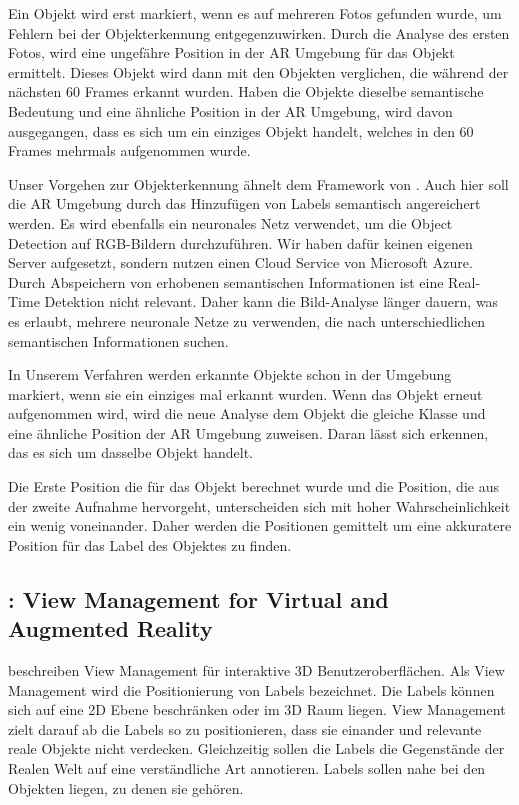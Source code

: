 Ein Objekt wird erst markiert, wenn es auf mehreren Fotos gefunden wurde, um Fehlern bei der Objekterkennung entgegenzuwirken. Durch die Analyse des ersten Fotos, wird eine ungefähre Position in der AR Umgebung für das Objekt ermittelt. Dieses Objekt wird dann mit den Objekten verglichen, die während der nächsten 60 Frames erkannt wurden. Haben die Objekte dieselbe semantische Bedeutung und eine ähnliche Position in der AR Umgebung, wird davon ausgegangen, dass es sich um ein einziges Objekt handelt, welches in den 60 Frames mehrmals aufgenommen wurde. 

Unser Vorgehen zur Objekterkennung ähnelt dem Framework von \cite{LabelingLanguageLearning}. Auch hier soll die AR Umgebung durch das Hinzufügen von Labels semantisch angereichert werden. Es wird ebenfalls ein neuronales Netz verwendet, um die Object Detection auf RGB-Bildern durchzuführen. Wir haben dafür keinen eigenen Server aufgesetzt, sondern nutzen einen Cloud Service von Microsoft Azure. Durch Abspeichern von erhobenen semantischen Informationen ist eine Real-Time Detektion nicht relevant. Daher kann die Bild-Analyse länger dauern, was es erlaubt, mehrere neuronale Netze zu verwenden, die nach unterschiedlichen semantischen Informationen suchen.

In Unserem Verfahren werden erkannte Objekte schon in der Umgebung markiert, wenn sie ein einziges mal erkannt wurden. Wenn das Objekt erneut aufgenommen wird, wird die neue Analyse dem Objekt die gleiche Klasse und eine ähnliche Position der AR Umgebung zuweisen. Daran lässt sich erkennen, das es sich um dasselbe Objekt handelt.

Die Erste Position die für das Objekt berechnet wurde und die Position, die aus der zweite Aufnahme hervorgeht, unterscheiden sich mit hoher Wahrscheinlichkeit ein wenig voneinander. Daher werden die Positionen gemittelt um eine akkuratere Position für das Label des Objektes zu finden. 
\citep{LabelingLanguageLearning}

\subsection{\cite{viewmanagement3d}: View Management for Virtual and Augmented Reality}

\cite{viewmanagement3d} beschreiben View Management für interaktive 3D Benutzeroberflächen. Als View Management wird die Positionierung von Labels bezeichnet.
Die Labels können sich auf eine 2D Ebene beschränken oder im 3D Raum liegen. View Management zielt darauf ab die Labels so zu positionieren, dass sie einander und relevante reale Objekte nicht verdecken. Gleichzeitig sollen die Labels die Gegenstände der Realen Welt auf eine verständliche Art annotieren. Labels sollen nahe bei den Objekten liegen, zu denen sie gehören.

